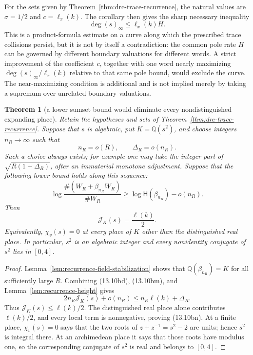 \documentclass[11pt,reqno]{amsart}
\newtheorem{theorem}{Theorem}[section]
\theoremstyle{definition}
\theoremstyle{remark}
\newcommand{\Q}{\mathbb Q}
\begin{document}
For the sets given by Theorem~\ref{thm:drc-trace-recurrence}, the
natural values are \(\sigma=1/2\) and \(c=\ell_x(k)\).  The corollary then
gives the sharp necessary inequality
\[
 \deg(s)_\infty\le\ell_x(k)H.
\tag{13.10bh12}
\]
This is a product-formula estimate on a curve along which the prescribed
trace collisions persist, but it is not by itself a contradiction: the
common pole rate \(H\) can be governed by
different boundary valuations for different words.  A strict improvement
of the coefficient \(c\), together with one word nearly maximizing
\(\deg(s)_\infty/\ell_x(k)\) relative to that same pole bound, would exclude
the curve.  The near-maximizing condition is additional and is not implied
merely by taking a supremum over unrelated boundary valuations.

\begin{theorem}[a lower sumset bound would eliminate every nondistinguished expanding place]
\label{thm:moving-height-criterion}
Retain the hypotheses and sets of
Theorem~\ref{thm:drc-trace-recurrence}.  Suppose that \(s\) is algebraic,
put \(K=\Q(s^2)\), and choose integers \(n_R\to\infty\) such that
\[
 n_R=o(R),\qquad \Delta_R=o(n_R).
\tag{13.10bl}
\]
Such a choice always exists; for example one may take the integer part of
\(\sqrt{R(1+\Delta_R)}\), after an immaterial monotone adjustment.  Suppose
that the following lower bound holds along this sequence:
\[
 \log\frac{\#(W_R+\beta_{n_R}W_R)}{\#W_R}
 \ge \log\mathsf H(\beta_{n_R})-o(n_R).
\tag{13.10bm}
\]
Then
\[
 \mathcal J_K(s)=\frac{\ell(k)}2.
\tag{13.10bn}
\]
Equivalently, \(\chi_v(s)=0\) at every place of \(K\) other than the
distinguished real place.  In particular, \(s^2\) is an algebraic integer
and every nonidentity conjugate of \(s^2\) lies in \([0,4]\).
\end{theorem}

\begin{proof}
Lemma~\ref{lem:recurrence-field-stabilization} shows that
\(\Q(\beta_{n_R})=K\) for all sufficiently large \(R\).  Combining
(13.10bd), (13.10bm), and Lemma~\ref{lem:recurrence-height} gives
\[
 2n_R\mathcal J_K(s)+o(n_R)
 \le n_R\ell(k)+\Delta_R.
\]
Thus \(\mathcal J_K(s)\le\ell(k)/2\).  The distinguished real place alone
contributes \(\ell(k)/2\), and every local term is nonnegative, proving
(13.10bn).  At a finite place, \(\chi_v(s)=0\) says that the two roots of
\(z+z^{-1}=s^2-2\) are units; hence \(s^2\) is integral there.  At an
archimedean place it says that those roots have modulus one, so the
corresponding conjugate of \(s^2\) is real and belongs to \([0,4]\).
\end{proof}
\end{document}
